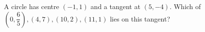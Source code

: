 A circle has centre $(-1,1)$ and a tangent at $(5,-4)$. Which of $(0 , \dfrac{6}{5}) , (4,7) , (10,2) , (11,1)$ lies on this tangent?
